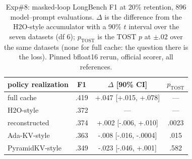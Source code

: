 \begin{table}[t]
\centering
\caption{Exp\#8: masked-loop LongBench F1 at 20\% retention, 896 model--prompt
evaluations. $\Delta$ is the difference from the H2O-style accumulator with a 90\% $t$
interval over the seven datasets (df 6); $p_{\mathrm{TOST}}$ is the TOST $p$ at
$\pm.02$ over the same datasets (none for full cache: the question there is the
loss). Pinned bfloat16 rerun, official scorer, all references.}
\label{tab:perlayer}
\footnotesize
\setlength{\tabcolsep}{3pt}
\begin{tabular*}{\columnwidth}{@{\extracolsep{\fill}}lccc@{}}
\toprule
policy realization & F1 & $\Delta$ [90\% CI] & $p_{\mathrm{TOST}}$ \\
\midrule
full cache & .419 & +.047 [+.015, +.078] & --- \\
H2O-style & .372 & --- & --- \\
reconstructed & .374 & +.002 [-.006, +.010] & .0023 \\
Ada-KV-style & .363 & -.008 [-.016, -.0004] & .015 \\
PyramidKV-style & .349 & -.023 [-.046, +.001] & .582 \\
\bottomrule
\end{tabular*}
\end{table}

